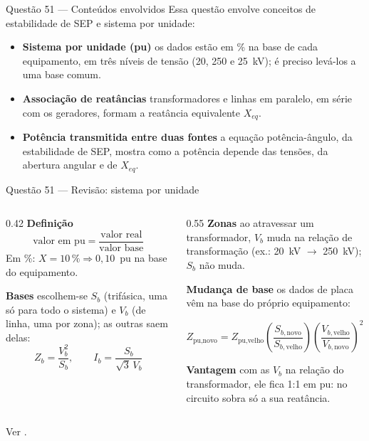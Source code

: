 \documentclass[aspectratio=169,11pt]{beamer}
\newcommand{\passo}[1]{{\color{Teal}\bfseries #1}\enspace}
\begin{document}
\begin{frame}{Questão 51 --- Conteúdos envolvidos}
  Essa questão envolve conceitos de \alert{estabilidade de SEP} e
  \alert{sistema por unidade}:
  \begin{itemize}
    \item \passo{Sistema por unidade (pu)} os dados estão em \% na base de
          cada equipamento, em três níveis de tensão (20, 250 e 25~kV); é
          preciso levá-los a uma base comum.
    \item \passo{Associação de reatâncias} transformadores e linhas em
          paralelo, em série com os geradores, formam a reatância
          equivalente $X_{eq}$.
    \item \passo{Potência transmitida entre duas fontes} a equação
          potência-ângulo, da estabilidade de SEP, mostra como a potência
          depende das tensões, da abertura angular e de $X_{eq}$.
  \end{itemize}
\end{frame}

\begin{frame}{Questão 51 --- Revisão: sistema por unidade}
  \small
  \begin{columns}[T]
    \begin{column}{0.42\textwidth}
      \passo{Definição}
      \[
        \text{valor em pu} = \frac{\text{valor real}}{\text{valor base}}
      \]
      Em \%: $X = 10\,\% \Rightarrow 0{,}10$~pu na base do equipamento.

      \vspace{0.6em}
      \passo{Bases} escolhem-se $S_b$ (trifásica, uma só para todo o
      sistema) e $V_b$ (de linha, uma por zona); as outras saem delas:
      \[
        Z_b = \frac{V_b^2}{S_b}, \qquad I_b = \frac{S_b}{\sqrt{3}\,V_b}
      \]
    \end{column}
    \begin{column}{0.55\textwidth}
      \pause
      \passo{Zonas} ao atravessar um transformador, $V_b$ muda na relação de
      transformação (ex.: 20~kV $\to$ 250~kV); $S_b$ não muda.

      \vspace{0.6em}\pause
      \passo{Mudança de base} os dados de placa vêm na base do próprio
      equipamento:
      \begin{conceito}[left=3pt,right=3pt]
        \centering
        $Z_{\text{pu,novo}} = Z_{\text{pu,velho}}
        \left(\dfrac{S_{b,\text{novo}}}{S_{b,\text{velho}}}\right)
        \left(\dfrac{V_{b,\text{velho}}}{V_{b,\text{novo}}}\right)^{2}$
      \end{conceito}
      \pause
      \passo{Vantagem} com as $V_b$ na relação do transformador, ele fica
      1:1 em pu: no circuito sobra só a sua reatância.
    \end{column}
  \end{columns}
  \vfill
  {\footnotesize\color{Mute} Ver \cite{stevenson1986elementos,bichels2018sep}.}
\end{frame}
\end{document}
